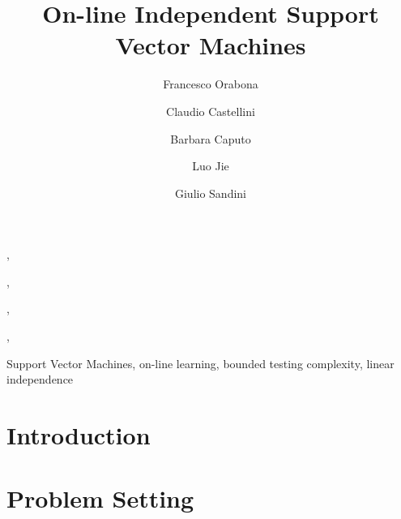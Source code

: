 \documentclass[doublespacing]{elsart}
\begin{document}
\begin{frontmatter}

\title{On-line Independent Support Vector Machines}

\author[IDIAP]{Francesco Orabona},
\author[LIRA]{Claudio Castellini},
\author[IDIAP]{Barbara Caputo},
\author[IDIAP,EPFL]{Luo Jie},
\author[IIT]{Giulio Sandini}

\address[IDIAP]{Idiap Research Institute, Centre du Parc, Rue Marconi 19, P.O. Box 592 --- CH-1920 Martigny, Switzerland}
\address[LIRA]{LIRA-Lab, University of Genova, viale F. Causa, 13, 16145 Genova, Italy}
\address[EPFL]{Swiss Federal Institute of Technology in Lausanne (EPFL), CH-1015 Lausanne, Switzerland.}
\address[IIT]{Italian Institute of Technology, via Morego 30, 16163 Genova, Italy.}

\begin{abstract}
  
\end{abstract}

\begin{keyword}
  Support Vector Machines, on-line learning, bounded testing
  complexity, linear independence
\end{keyword}

\end{frontmatter}

\section{Introduction}
\label{sec:introduction}


%

\section{Problem Setting}
\label{sec:SVM}


%
\end{document}
